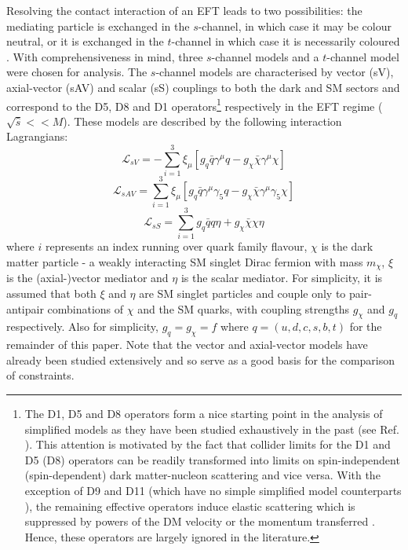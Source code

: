 \begin{flushleft}
Resolving the contact interaction of an EFT leads to two possibilities: the mediating particle is exchanged in the $s$-channel, in which case it may be colour neutral, or it is exchanged in the $t$-channel in which case it is necessarily coloured \cite{}. With comprehensiveness in mind, three $s$-channel models and a $t$-channel model were chosen for analysis. The $s$-channel models are characterised by vector (sV), axial-vector (sAV) and scalar (sS) couplings to both the dark and SM sectors and correspond to the D5, D8 and D1 operators\footnote{The D1, D5 and D8 operators form a nice starting point in the analysis of simplified models as they have been studied exhaustively in the past (see Ref. \cite{}). This attention is motivated by the fact that collider limits for the D1 and D5 (D8) operators can be readily transformed into limits on spin-independent (spin-dependent) dark matter-nucleon scattering and vice versa. With the exception of D9 and D11 (which have no simple simplified model counterparts \cite{}), the remaining effective operators induce elastic scattering which is suppressed by powers of the DM velocity or the momentum transferred \cite{Kumar}. Hence, these operators are largely ignored in the literature.} respectively in the EFT regime ($\sqrt{\hat{s}} << M$). These models are described by the following interaction Lagrangians:
\begin{equation}
\label{L_int_sV}
\mathcal{L}_{sV} = -\sum\limits_{i=1}^{3} \xi_{\mu}\left[g_{q}\bar{q}\gamma^{\mu}q - g_{\chi}\bar{\chi}\gamma^{\mu}\chi\right]
\end{equation}
\begin{equation}
\label{L_int_sAV}
\mathcal{L}_{sAV} = \sum\limits_{i=1}^{3} \xi_{\mu}\left[g_{q}\bar{q}\gamma^{\mu}\gamma_{5}q - g_{\chi}\bar{\chi}\gamma^{\mu}\gamma_{5}\chi\right]
\end{equation}
\begin{equation}
\label{L_int_sS}
\mathcal{L}_{sS} = \sum\limits_{i=1}^{3} g_{q}\bar{q}q\eta + g_{\chi}\bar{\chi}\chi\eta
\end{equation}
where $i$ represents an index running over quark family flavour, $\chi$ is the dark matter particle - a weakly interacting SM singlet Dirac fermion with mass $m_{\chi}$, $\xi$ is the (axial-)vector mediator and $\eta$ is the scalar mediator. For simplicity, it is assumed that both $\xi$ and $\eta$ are SM singlet particles and couple only to pair-antipair combinations of $\chi$ and the SM quarks, with coupling strengths $g_{\chi}$ and $g_q$ respectively. Also for simplicity, $g_q = g_{\chi}=f$ where $q = (u, d, c, s, b, t)$ for the remainder of this paper. Note that the vector and axial-vector models have already been studied extensively \cite{Buchmueller:2014yoa, Chatrchyan:2013qha, Aad:2012hf, Harris:2014hga} and so serve as a good basis for the comparison of constraints.


\end{flushleft}
